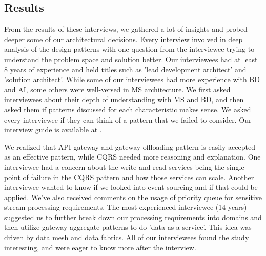 \documentclass[a4paper,11pt,article,oneside]{memoir}
\begin{document}



\subsection{Results}

From the results of these interviews, we gathered a lot of insights and probed deeper some of our architectural decisions. Every interview involved in deep analysis of the design patterns with one question from the interviewee trying to understand the problem space and solution better. Our interviewees had at least 8 years of experience and held titles such as 'lead development architect' and 'solution architect'. While some of our interviewees had more experience with BD and AI, some others were well-versed in MS architecture. We first asked interviewees about their depth of understanding with MS and BD, and then asked them if patterns discussed for each characteristic makes sense. We asked every interviewee if they can think of a pattern that we failed to consider. Our interview guide is available at \cite{interviewGuide}.




We realized that API gateway and gateway offloading pattern is easily accepted as an effective pattern, while CQRS needed more reasoning and explanation. One interviewee had a concern about the write and read services being the single point of failure in the CQRS pattern and how those services can scale. Another interviewee wanted to know if we looked into event sourcing and if that could be applied. We've also received comments on the usage of priority queue for sensitive stream processing requirements. The most experienced interviewee (14 years) suggested us to further break down our processing requirements into domains and then utilize gateway aggregate patterns to do 'data as a service'. This idea was driven by data mesh and data fabrics. All of our interviewees found the study interesting, and were eager to know more after the interview. 
\end{document}
